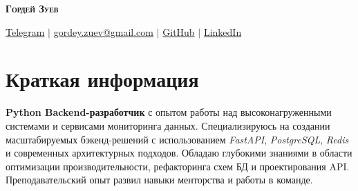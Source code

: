 \documentclass[letterpaper,11pt]{article}
\begin{document}
\begin{center}
    \textsc{\Huge{\textbf{Гордей Зуев}}} \\ \vspace{1pt}
    
    \href{https://t.me/gordeyzuev}{\textcolor{blue!50!black}{Telegram}} $|$
    \href{mailto:gordey.zuev@gmail.com}{\textcolor{blue!50!black}{gordey.zuev@gmail.com}} $|$
    \href{https://github.com/GordeyZuev}{\textcolor{blue!50!black}{GitHub}} $|$
    \href{https://www.linkedin.com/in/gordey-zuev/}{\textcolor{blue!50!black}{LinkedIn}}
\end{center}


\section{Краткая информация}
 \begin{itemize}[leftmargin=0.15in, label={}]
    \small{\item{
     \textbf{Python Backend-разработчик} с опытом работы над высоконагруженными системами и сервисами мониторинга данных. Специализируюсь на создании масштабируемых бэкенд-решений с использованием \textit{FastAPI}, \textit{PostgreSQL}, \textit{Redis} и современных архитектурных подходов. Обладаю глубокими знаниями в области оптимизации производительности, рефакторинга схем БД и проектирования API. Преподавательский опыт развил навыки менторства и работы в команде.
    }}
 \end{itemize}


\end{document}
